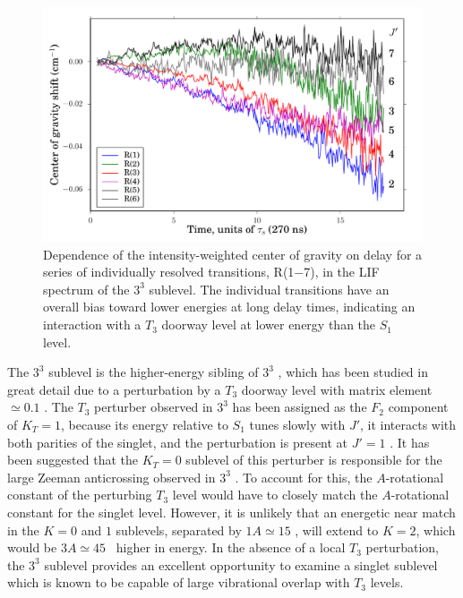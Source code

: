 \documentclass[12pt]{mitthesis}
\begin{document}
\begin{figure}
  \caption{Dependence of the intensity-weighted center of gravity on
    delay for a series of individually resolved transitions, R(1$-$7),
    in the LIF spectrum of the $3^3$  sublevel.  The individual
    transitions have an overall bias toward lower energies at long
    delay times, indicating an interaction with a $T_3$ doorway level
    at lower energy than the $S_1$ level.}
  \label{fig:33k2-cog-delay}
  \centering
  \includegraphics[width=6in]{33k2-r123456-cog-delay.pdf}
\end{figure}


The $3^3$  sublevel is the higher-energy sibling of $3^3$
, which has been studied in great detail due to a
perturbation by a $T_3$ doorway level with matrix element $\simeq
0.1$ \rcm.  The $T_3$ perturber observed in $3^3$  has been
assigned as the $F_2$ component of $K_T=1$, because 
its energy relative to $S_1$ tunes slowly with $J'$,
it interacts with both parities of the singlet, and
the perturbation is present at $J'=1$
\cite{mishra04}.  It has been suggested that the $K_T=0$ sublevel of
this perturber is responsible for the large Zeeman anticrossing
observed in $3^3$  \cite{thom07, dupre93}.  To account for this,
the $A$-rotational constant of the perturbing $T_3$ level would have
to closely match the $A$-rotational constant for the singlet level.
However, it is unlikely that an energetic near match in the $K=0$ and
$1$ sublevels, separated by $1A \simeq 15$ \rcm, will extend to $K=2$,
which would be $3A \simeq 45$ \rcm\ higher in energy.  In the absence
of a local $T_3$ perturbation, the $3^3$  sublevel provides an
excellent opportunity to examine a singlet sublevel which is known to
be capable of large vibrational overlap with $T_3$ levels.
\end{document}
